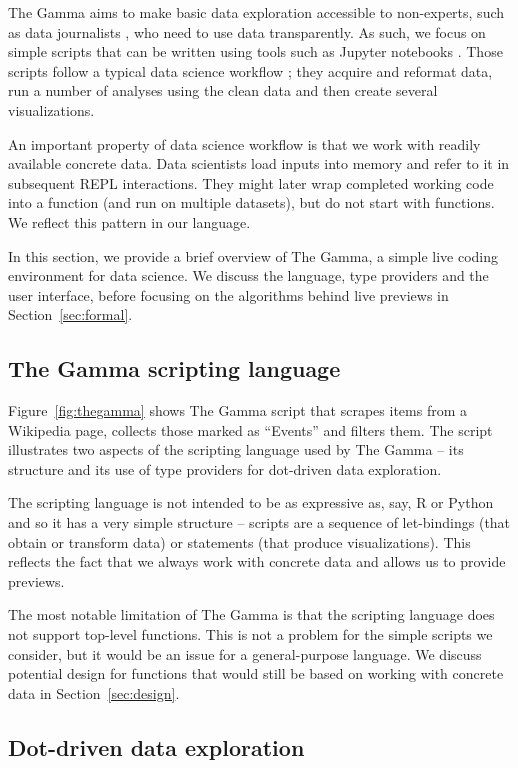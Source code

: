 \documentclass[sigplan,10pt]{acmart}\settopmatter{printfolios=true,printccs=false,printacmref=false}
\theoremstyle{plain}
\theoremstyle{definition}
\begin{document}
The Gamma aims to make basic data exploration accessible to non-experts, such as data journalists \cite{ddj}, 
who need to use data transparently. As such, we focus on simple scripts that can be written using
tools such as Jupyter notebooks \cite{jupyter}. Those scripts follow a typical data science workflow \cite{workflow};
they acquire and reformat data, run a number of analyses using the clean data and then create 
several visualizations.

An important property of data science workflow is that we work with readily available concrete data.
Data scientists load inputs into memory and refer to it in subsequent REPL interactions. They might 
later wrap completed working code into a function (and run on multiple datasets), but 
do not start with functions. We reflect this pattern in our language. 

In this section, we provide a brief overview of The Gamma, a simple live coding environment for
data science. We discuss the language, type providers and the user interface,
before focusing on the algorithms behind live previews in Section~\ref{sec:formal}.

\subsection{The Gamma scripting language}
Figure~\ref{fig:thegamma} shows The Gamma script that scrapes items from a Wikipedia page, 
collects those marked as ``Events'' and filters them. The script illustrates two aspects of the
scripting language used by The Gamma -- its structure and its use of type providers for
dot-driven data exploration.

The scripting language is not intended to be as expressive as, say, R or Python and so it
has a very simple structure -- scripts are a sequence of let-bindings (that obtain or transform 
data) or statements (that produce visualizations). This reflects the fact that we always work
with concrete data and allows us to provide previews.

The most notable limitation of The Gamma is that the scripting language does not support top-level 
functions. This is not a problem for the simple scripts we consider, but it would be an issue for
a general-purpose language. We discuss potential design for functions that would still be based
on working with concrete data in Section~\ref{sec:design}.

\subsection{Dot-driven data exploration}
\end{document}
